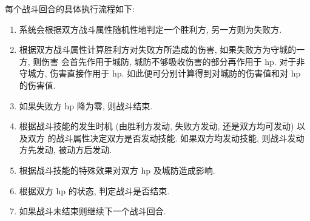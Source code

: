 \documentclass[UTF8, zihao=-4]{ctexart} %
\begin{document}
每个战斗回合的具体执行流程如下: 
\begin{enumerate}
    \item 系统会根据双方战斗属性随机性地判定一个胜利方, 另一方则为失败方. 
    \item 根据双方战斗属性计算胜利方对失败方所造成的伤害, 如果失败方为守城的一方, 则伤害
        会首先作用于城防, 城防不够吸收伤害的部分再作用于 hp. 对于非守城方, 伤害直接作用于 hp. 
        如此便可分别计算得到对城防的伤害值和对 hp 的伤害值.
    \item 如果失败方 hp 降为零, 则战斗结束.
    \item 根据战斗技能的发生时机 (由胜利方发动, 失败方发动, 还是双方均可发动) 以及双方
        的战斗属性决定双方是否发动技能. 如果双方均发动技能, 则战斗发动方先发动, 被动方后发动.
    \item 根据战斗技能的特殊效果对双方 hp 及城防造成影响.
    \item 根据双方 hp 的状态, 判定战斗是否结束.
    \item 如果战斗未结束则继续下一个战斗回合.
\end{enumerate}
\end{document}
